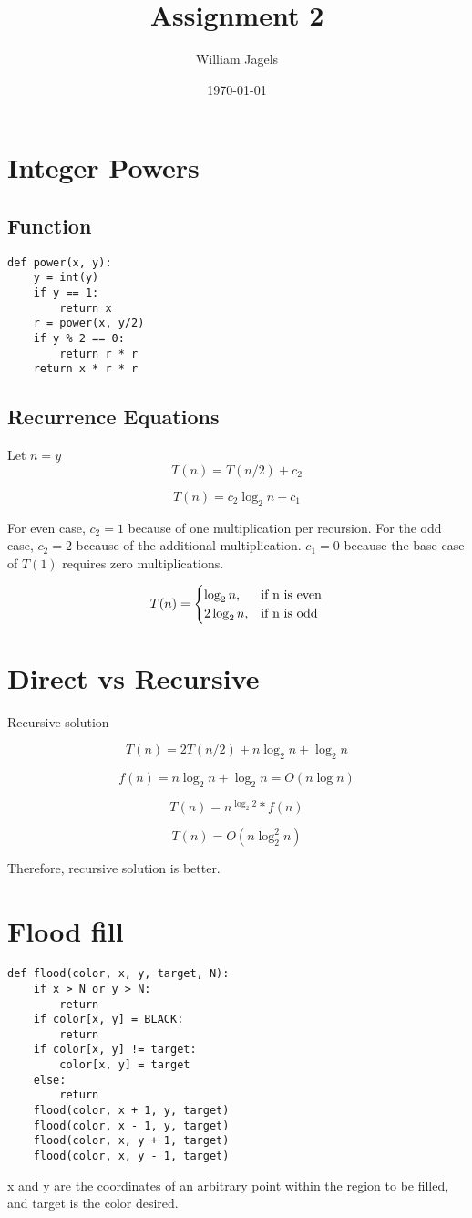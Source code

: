 \documentclass[a4paper,12pt]{article}
\title{Assignment 2}
\author{William Jagels}
\date{\today}
\begin{document}
\maketitle

\section{Integer Powers}
\subsection{Function}
\begin{lstlisting}
def power(x, y):
    y = int(y)
    if y == 1:
        return x
    r = power(x, y/2)
    if y % 2 == 0:
        return r * r
    return x * r * r
\end{lstlisting}
\subsection{Recurrence Equations}
Let $n = y$
$$T(n) = T(n/2) + c_2$$

$$T(n) = c_2 \log_2{n} + c_1$$

For even case, $c_2 = 1$ because of one multiplication per recursion.
For the odd case, $c_2 = 2$ because of the additional multiplication.
$c_1 = 0$ because the base case of $T(1)$ requires zero multiplications.

\begin{equation}
T(n) =
\begin{cases}
  \log_2{n}, & $if\ n is even$\\
  2\log_2{n}, & $if\ n is odd$
\end{cases}
\end{equation}

\section{Direct vs Recursive}
Recursive solution

$$T(n) = 2T(n/2) + n\log_2 n + \log_2 n$$

$$f(n) = n\log_2 n + \log_2 n = O(n \log n)$$

$$T(n) = n^{\log_2 2} * f(n)$$

$$T(n) = O(n \log_2^2 n)$$

Therefore, recursive solution is better.

\section{Flood fill}
\begin{lstlisting}
def flood(color, x, y, target, N):
    if x > N or y > N:
        return
    if color[x, y] = BLACK:
        return
    if color[x, y] != target:
        color[x, y] = target
    else:
        return
    flood(color, x + 1, y, target)
    flood(color, x - 1, y, target)
    flood(color, x, y + 1, target)
    flood(color, x, y - 1, target)
\end{lstlisting}
x and y are the coordinates of an arbitrary point within the region to be filled, and target is the color desired.
\end{document}
